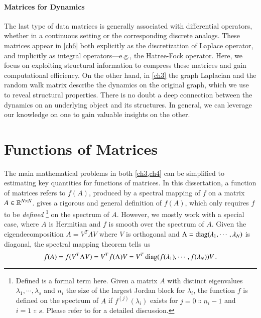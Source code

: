 \paragraph{Matrices for Dynamics}

The last type of data matrices is generally associated with differential
operators, whether in a continuous setting or the corresponding discrete
analogs. These matrices appear in \cref{ch6} both explicitly as
the discretization of Laplace operator, and implicitly as integral
operators---e.g., the Hatree\hyp{}Fock operator. Here, we focus on exploiting
structural information to compress these matrices and gain computational
efficiency. On the other hand, in \cref{ch3} the graph Laplacian and the random
walk matrix describe the dynamics on the original graph, which we use to reveal
structural properties. There is no doubt a deep connection between the dynamics
on an underlying object and its structures. In general, we can leverage our
knowledge on one to gain valuable insights on the other.

\section{Functions of Matrices}\label{pre:fom}

The main mathematical problems in both \cref{ch3,ch4} can be simplified to
estimating key quantities for functions of matrices. In this dissertation, a
function of matrices refers to $f(A)$, produced by a spectral mapping of $f$ on
a matrix $A\in\mathbb{R}^{N\mathbin{\times} N}$. \citet{higham2008functions} gives a rigorous
and general definition of $f(A)$, which only requires $f$ to be \emph{defined}
\footnote{Defined is a formal term here. Given a matrix $A$ with distinct
eigenvalues $\lambda_1,\cdots,\lambda_s$ and $n_i$ the size of the largest
Jordan block for $\lambda_i$, the function $f$ is defined on the spectrum of $A$
if $f^{(j)}(\lambda_i)$ exists for $j = 0\Colon n_i-1$ and $i = 1\Colon s$.
Please refer to \cite[Definition~1.1]{higham2008functions} for a detailed
discussion.} on the spectrum of $A$. However, we mostly work with a special
case, where $A$ is Hermitian and $f$ is smooth over the spectrum of $A$. Given
the eigendecomposition $A = V^T\Lambda V$ where $V$ is orthogonal and $\Lambda =
\operatorname{diag}(\lambda_1,\cdots,\lambda_N)$ is diagonal, the spectral mapping theorem
tells us
\begin{equation}\label{eqn:smt}
	f(A) = f(V^T\Lambda V) = V^T f(\Lambda)V = V^T\operatorname{diag}(f(\lambda_1),\cdots,f
	(\lambda_N))V\,.
\end{equation}


